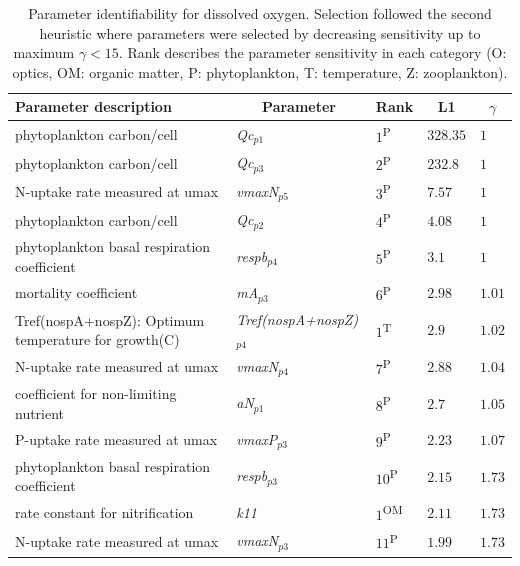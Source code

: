 \documentclass[letterpaper,12pt,oneside]{article}\usepackage[]{graphicx}\usepackage[]{color}
\begin{document}
\begin{table}[!tbp]
{\normalsize
\caption{Parameter identifiability for dissolved oxygen.  Selection followed the second heuristic where parameters were selected by decreasing sensitivity up to maximum $\gamma < 15$.  Rank describes the parameter sensitivity in each category (O: optics, OM: organic matter, P: phytoplankton, T: temperature, Z: zooplankton).\label{tab:identall1}} 
\begin{center}
\begin{tabular}{lllll}
\hline\hline
\multicolumn{1}{l}{Parameter description}&\multicolumn{1}{c}{Parameter}&\multicolumn{1}{c}{Rank}&\multicolumn{1}{c}{L1}&\multicolumn{1}{c}{$\gamma$}\tabularnewline
\hline
\scriptsize{phytoplankton carbon/cell}&\scriptsize{\textit{Qc$_{p1}$}}&$1$\textsuperscript{P}&$328.35$&$1$\tabularnewline
\scriptsize{phytoplankton carbon/cell}&\scriptsize{\textit{Qc$_{p3}$}}&$2$\textsuperscript{P}&$232.8$&$1$\tabularnewline
\scriptsize{N-uptake rate measured at umax}&\scriptsize{\textit{vmaxN$_{p5}$}}&$3$\textsuperscript{P}&$7.57$&$1$\tabularnewline
\scriptsize{phytoplankton carbon/cell}&\scriptsize{\textit{Qc$_{p2}$}}&$4$\textsuperscript{P}&$4.08$&$1$\tabularnewline
\scriptsize{phytoplankton basal respiration coefficient}&\scriptsize{\textit{respb$_{p4}$}}&$5$\textsuperscript{P}&$3.1$&$1$\tabularnewline
\scriptsize{mortality coefficient}&\scriptsize{\textit{mA$_{p3}$}}&$6$\textsuperscript{P}&$2.98$&$1.01$\tabularnewline
\scriptsize{Tref(nospA+nospZ): Optimum temperature for growth(C)}&\scriptsize{\textit{Tref(nospA+nospZ)$_{p4}$}}&$1$\textsuperscript{T}&$2.9$&$1.02$\tabularnewline
\scriptsize{N-uptake rate measured at umax}&\scriptsize{\textit{vmaxN$_{p4}$}}&$7$\textsuperscript{P}&$2.88$&$1.04$\tabularnewline
\scriptsize{coefficient for non-limiting nutrient}&\scriptsize{\textit{aN$_{p1}$}}&$8$\textsuperscript{P}&$2.7$&$1.05$\tabularnewline
\scriptsize{P-uptake rate measured at umax}&\scriptsize{\textit{vmaxP$_{p3}$}}&$9$\textsuperscript{P}&$2.23$&$1.07$\tabularnewline
\scriptsize{phytoplankton basal respiration coefficient}&\scriptsize{\textit{respb$_{p3}$}}&$10$\textsuperscript{P}&$2.15$&$1.73$\tabularnewline
\scriptsize{rate constant for nitrification}&\scriptsize{\textit{k11}}&$1$\textsuperscript{OM}&$2.11$&$1.73$\tabularnewline
\scriptsize{N-uptake rate measured at umax}&\scriptsize{\textit{vmaxN$_{p3}$}}&$11$\textsuperscript{P}&$1.99$&$1.73$\tabularnewline

\end{tabular}
\end{center}}
\end{table}
\end{document}
